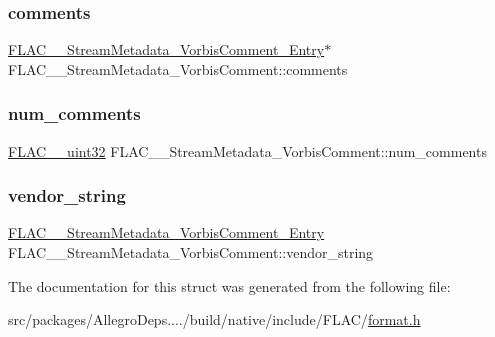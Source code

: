 \subsubsection{\texorpdfstring{comments}{comments}}
{\footnotesize\ttfamily \hyperlink{struct_f_l_a_c_____stream_metadata___vorbis_comment___entry}{F\+L\+A\+C\+\_\+\+\_\+\+Stream\+Metadata\+\_\+\+Vorbis\+Comment\+\_\+\+Entry}$\ast$ F\+L\+A\+C\+\_\+\+\_\+\+Stream\+Metadata\+\_\+\+Vorbis\+Comment\+::comments}

\mbox{\label{struct_f_l_a_c_____stream_metadata___vorbis_comment_a6b5a521443691bc3f195c97b60203a3e}} 
\subsubsection{\texorpdfstring{num\+\_\+comments}{num\_comments}}
{\footnotesize\ttfamily \hyperlink{ordinals_8h_a9c4005ea7ef8d564b0cc993cdd0e4e5e}{F\+L\+A\+C\+\_\+\+\_\+uint32} F\+L\+A\+C\+\_\+\+\_\+\+Stream\+Metadata\+\_\+\+Vorbis\+Comment\+::num\+\_\+comments}

\mbox{\label{struct_f_l_a_c_____stream_metadata___vorbis_comment_a7a6dd7bacee57f0a59ac2d843cb79f98}} 
\subsubsection{\texorpdfstring{vendor\+\_\+string}{vendor\_string}}
{\footnotesize\ttfamily \hyperlink{struct_f_l_a_c_____stream_metadata___vorbis_comment___entry}{F\+L\+A\+C\+\_\+\+\_\+\+Stream\+Metadata\+\_\+\+Vorbis\+Comment\+\_\+\+Entry} F\+L\+A\+C\+\_\+\+\_\+\+Stream\+Metadata\+\_\+\+Vorbis\+Comment\+::vendor\+\_\+string}



The documentation for this struct was generated from the following file\+:\begin{DoxyCompactItemize}
\item 
src/packages/\+Allegro\+Deps..../build/native/include/\+F\+L\+A\+C/\hyperlink{format_8h}{format.\+h}\end{DoxyCompactItemize}
